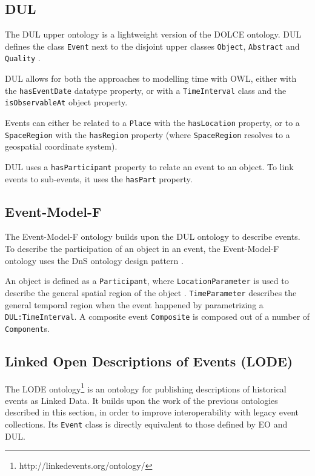 \subsection{DUL}

The \ac{DUL} upper ontology is a lightweight version of the \ac{DOLCE} ontology. \ac{DUL} defines the class \texttt{Event} next to the disjoint upper classes \texttt{Object}, \texttt{Abstract} and \texttt{Quality} \cite{Scherp2011}.

\ac{DUL} allows for both the approaches to modelling time with \ac{OWL}, either with the \texttt{hasEventDate} datatype property, or with a \texttt{TimeInterval} class and the \texttt{isObservableAt} object property.

Events can either be related to a \texttt{Place} with the \texttt{hasLocation} property, or to a \texttt{SpaceRegion} with the \texttt{hasRegion} property (where \texttt{SpaceRegion} resolves to a geospatial coordinate system).

\ac{DUL} uses a \texttt{hasParticipant} property to relate an event to an object. To link events to sub-events, it uses the \texttt{hasPart} property.

\subsection{Event-Model-F}

The Event-Model-F ontology builds upon the \ac{DUL} ontology to describe events. To describe the participation of an object in an event, the Event-Model-F ontology uses the \ac{DnS} ontology design pattern \cite{Shaw2009}. 

An object is defined as a \texttt{Participant}, where \texttt{LocationParameter} is used to describe the general spatial region of the object \cite{Scherp2011}. \texttt{TimeParameter} describes the general temporal region when the event happened by parametrizing a \texttt{DUL:TimeInterval}. A composite event \texttt{Composite} is composed out of a number of \texttt{Component}s.

\subsection{Linked Open Descriptions of Events (LODE)}

The \ac{LODE} ontology\footnote{http://linkedevents.org/ontology/} is an ontology for publishing descriptions of historical events as Linked Data. It builds upon the work of the previous ontologies described in this section, in order to improve interoperability with legacy event collections. Its \texttt{Event} class is directly equivalent to those defined by \ac{EO} and \ac{DUL}. 

